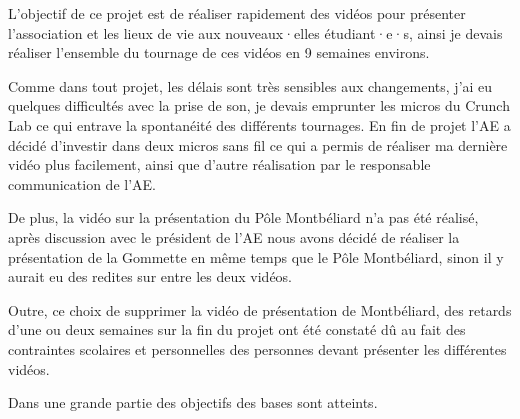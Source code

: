 L'objectif de ce projet est de réaliser rapidement des vidéos pour présenter l'association et les lieux de vie aux nouveaux·elles étudiant·e·s, ainsi je devais réaliser l'ensemble du tournage de ces vidéos en 9 semaines environs.

Comme dans tout projet, les délais sont très sensibles aux changements, j'ai eu quelques difficultés avec la prise de son, je devais emprunter les micros du Crunch Lab ce qui entrave la spontanéité des différents tournages.
En fin de projet l'\gls{AE} a décidé d'investir dans deux micros sans fil ce qui a permis de réaliser ma dernière vidéo plus facilement, ainsi que d'autre réalisation par le responsable communication de l'\gls{AE}.

De plus, la vidéo sur la présentation du Pôle Montbéliard n'a pas été réalisé, après discussion avec le président de l'\gls{AE} nous avons décidé de réaliser la présentation de la Gommette en même temps que le Pôle Montbéliard, sinon il y aurait eu des redites sur entre les deux vidéos.

Outre, ce choix de supprimer la vidéo de présentation de Montbéliard, des retards d'une ou deux semaines sur la fin du projet ont été constaté dû au fait des contraintes scolaires et personnelles des personnes devant présenter les différentes vidéos.

Dans une grande partie des objectifs des bases sont atteints.




